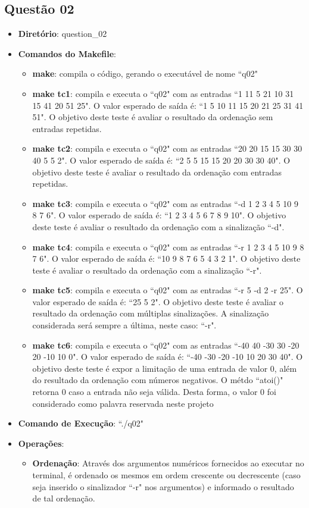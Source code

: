 	\subsection{Questão 02}
			\begin{itemize}
				\item{\textbf{Diretório}: question\_02}
				\item{\textbf{Comandos do Makefile}:
				\begin{itemize}
					\item{\textbf{make}: compila o código, gerando o executável de nome ``q02"}
					\item{\textbf{make tc1}: compila e executa o ``q02" com as entradas ``1 11 5 21 10 31 15 41 20 51 25". O valor esperado de saída é: ``1 5 10 11 15 20 21 25 31 41 51". O objetivo deste teste é avaliar o resultado da ordenação sem entradas repetidas.}
					\item{\textbf{make tc2}: compila e executa o ``q02" com as entradas ``20 20 15 15 30 30 40 5 5 2". O valor esperado de saída é: ``2 5 5 15 15 20 20 30 30 40". O objetivo deste teste é avaliar o resultado da ordenação com entradas repetidas.}
					\item{\textbf{make tc3}: compila e executa o ``q02" com as entradas ``-d 1 2 3 4 5 10 9 8 7 6". O valor esperado de saída é: ``1 2 3 4 5 6 7 8 9 10". O objetivo deste teste é avaliar o resultado da ordenação com a sinalização ``-d".}
					\item{\textbf{make tc4}: compila e executa o ``q02" com as entradas ``-r 1 2 3 4 5 10 9 8 7 6". O valor esperado de saída é: ``10 9 8 7 6 5 4 3 2 1". O objetivo deste teste é avaliar o resultado da ordenação com a sinalização ``-r".}
					\item{\textbf{make tc5}: compila e executa o ``q02" com as entradas ``-r 5 -d 2 -r 25". O valor esperado de saída é: ``25 5 2". O objetivo deste teste é avaliar o resultado da ordenação com múltiplas sinalizações. A sinalização considerada será sempre a última, neste caso: ``-r".}
					\item{\textbf{make tc6}: compila e executa o ``q02" com as entradas ``-40 40 -30 30 -20 20 -10 10 0". O valor esperado de saída é: ``-40 -30 -20 -10 10 20 30 40". O objetivo deste teste é expor a limitação de uma entrada de valor $0$, além do resultado da ordenação com números negativos. O métdo ``atoi()" retorna $0$ caso a entrada não seja válida. Desta forma, o valor $0$ foi considerado como palavra reservada neste projeto}
				\end{itemize}}
				\item{\textbf{Comando de Execução}: ``./q02"}
				\item{\textbf{Operações}:
				\begin{itemize}
					\item{\textbf{Ordenação}: Através dos argumentos numéricos fornecidos ao executar no terminal, é ordenado os mesmos em ordem crescente ou decrescente (caso seja inserido o sinalizador ``-r" nos argumentos) e informado o resultado de tal ordenação.}
				\end{itemize}}
			\end{itemize}

